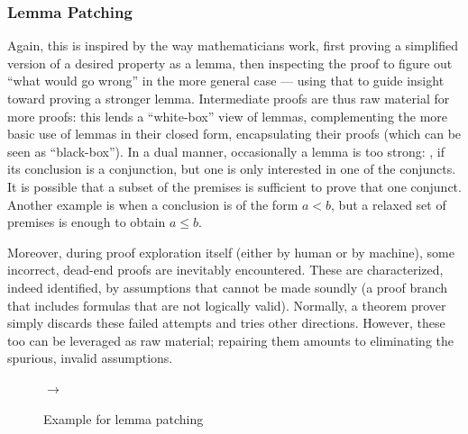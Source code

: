 \subsubsection{Lemma Patching}

Again, this is inspired by the way mathematicians work, first proving a
simplified version of a desired property as a lemma, then inspecting the proof
to figure out ``what would go wrong'' in the more general case --- using that to guide insight toward
proving a stronger lemma.
Intermediate proofs are thus raw material for more proofs: this lends a
``white-box'' view of lemmas, complementing the more basic use of lemmas in
their closed form, encapsulating their proofs (which can be seen as
``black-box'').
In a dual manner, occasionally a lemma is too strong: \eg, if its conclusion is
a conjunction, but one is only interested in one of the conjuncts.
It is possible that a subset of the premises is sufficient to prove that one
conjunct.
Another example is when a conclusion is of the form $a < b$, but a relaxed set
of premises is enough to obtain $a \leq b$.

Moreover, during proof exploration itself (either by human or by machine), some
incorrect, dead-end proofs are inevitably encountered.
These are characterized, indeed identified, by assumptions that cannot be made
soundly (\eg a proof branch that includes formulas that are not logically valid).
Normally, a theorem prover simply discards these failed attempts and tries
other directions.
However, these too can be leveraged as raw material; repairing them amounts to
eliminating the spurious, invalid assumptions.

\begin{figure}
\centering
{}
$\longrightarrow$~~
\caption{Example for lemma patching}
\label{lemma-patching-example}
\end{figure}



